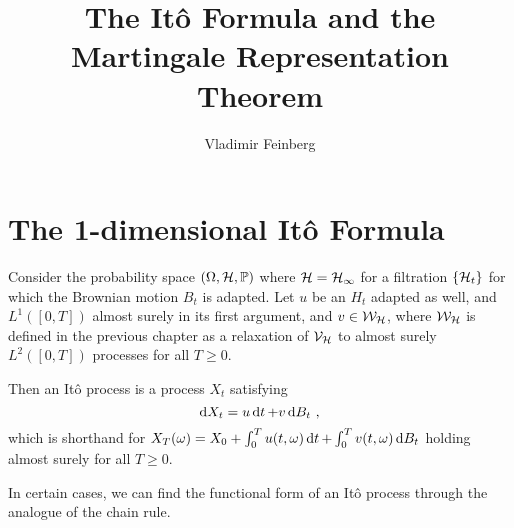 \documentclass{article}
\title{The It\^{o} Formula and the Martingale Representation Theorem}
\author{Vladimir Feinberg}
\begin{document}
\maketitle

\section{The 1-dimensional It\^{o} Formula}

\begin{definition}[It\^{o} Process]
  Consider the probability space \((\Omega, \mathcal{H},\operatorname{\mathbb{P}})\) where \(\mathcal{H}=\mathcal{H}_\infty\) for a filtration \(\left\{{\mathcal{H}_t}\right\}\) for which the Brownian motion \(B_t\) is adapted. Let \(u\) be an \(H_t\) adapted as well, and \(L^1([0,T])\) almost surely in its first argument, and \(v\in\mathcal{W}_{\mathcal{H}}\), where \(\mathcal{W}_{\mathcal{H}}\) is defined in the previous chapter as a relaxation of \(\mathcal{V}_{\mathcal{H}}\) to almost surely \(L^2([0,T])\) processes for all \(T\ge 0\).

  Then an It\^{o} process is a process \(X_t\) satisfying
  \[
    \mathop{\mathrm{d} X_t }=u \mathop{\mathrm{d} t }+v\mathop{\mathrm{d} B_t }\,\,,
  \]
  which is shorthand for \(X_T(\omega)=X_0+\int_0^T u(t,\omega)\mathop{\mathrm{d} t }+\int_0^T v(t, \omega)\mathop{\mathrm{d} B_t }\) holding almost surely for all \(T\ge 0\).
\end{definition}

In certain cases, we can find the functional form of an It\^{o} process through the analogue of the chain rule.
\end{document}
